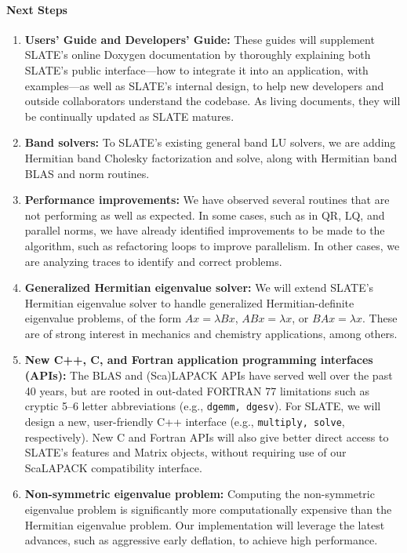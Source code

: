 \paragraph{Next Steps}

\begin{enumerate}

\item
\textbf{Users' Guide and Developers' Guide:}
These guides will supplement SLATE's online Doxygen documentation by thoroughly
explaining both SLATE's public interface---how to integrate it into an
application, with examples---as well as SLATE's internal design, to help
new developers and outside collaborators understand the codebase. As living
documents, they will be continually updated as SLATE matures.

\item
\textbf{Band solvers:}
To SLATE's existing general band LU solvers,
we are adding Hermitian band Cholesky factorization and solve,
along with Hermitian band BLAS and norm routines.

\item
\textbf{Performance improvements:}
We have observed several routines that are not performing as well as expected.
In some cases, such as in QR, LQ, and parallel norms, we have already identified
improvements to be made to the algorithm, such as refactoring loops to improve
parallelism. In other cases, we are analyzing traces to identify and
correct problems.

\item
\textbf{Generalized Hermitian eigenvalue solver:}
We will extend SLATE's Hermitian eigenvalue solver to
handle generalized Hermitian-definite eigenvalue problems, of the form
$Ax = \lambda Bx$, $ABx = \lambda x$, or $BAx = \lambda x$.
These are of strong interest in mechanics and chemistry applications,
among others.

\item
\textbf{New C++, C, and Fortran application programming interfaces (APIs):}
The BLAS and (Sca)LAPACK APIs have served well over the past 40 years, but are
rooted in out-dated FORTRAN 77 limitations such as cryptic 5--6 letter
abbreviations (e.g., \texttt{dgemm, dgesv}). For SLATE, we will design a new,
user-friendly C++ interface (e.g., \texttt{multiply, solve}, respectively). New
C and Fortran APIs will also give better direct access to SLATE's features and
Matrix objects, without requiring use of our ScaLAPACK compatibility interface.

\item
\textbf{Non-symmetric eigenvalue problem:}
Computing the non-symmetric eigenvalue problem is significantly more
computationally expensive than the Hermitian eigenvalue problem. Our
implementation will leverage the latest advances, such as aggressive early
deflation, to achieve high performance.

\end{enumerate}
